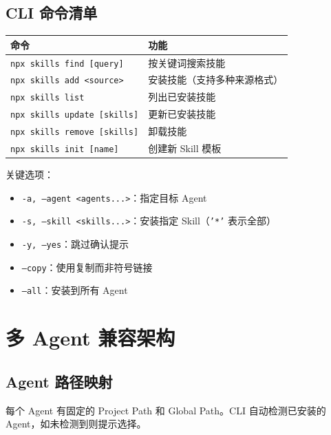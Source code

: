 \documentclass[11pt,a4paper]{article}
\begin{document}
\subsection{CLI 命令清单}

\begin{table}[h]
\centering
\begin{tabularx}{\linewidth}{lX}
\toprule
\textbf{命令} & \textbf{功能} \\
\midrule
\texttt{npx skills find [query]} & 按关键词搜索技能 \\
\texttt{npx skills add <source>} & 安装技能（支持多种来源格式） \\
\texttt{npx skills list} & 列出已安装技能 \\
\texttt{npx skills update [skills]} & 更新已安装技能 \\
\texttt{npx skills remove [skills]} & 卸载技能 \\
\texttt{npx skills init [name]} & 创建新 Skill 模板 \\
\bottomrule
\end{tabularx}
\end{table}

关键选项：
\begin{itemize}[nosep]
  \item \texttt{-a, --agent <agents...>}：指定目标 Agent
  \item \texttt{-s, --skill <skills...>}：安装指定 Skill（\texttt{'*'} 表示全部）
  \item \texttt{-y, --yes}：跳过确认提示
  \item \texttt{--copy}：使用复制而非符号链接
  \item \texttt{--all}：安装到所有 Agent
\end{itemize}

\section{多 Agent 兼容架构}

\subsection{Agent 路径映射}

每个 Agent 有固定的 Project Path 和 Global Path。CLI 自动检测已安装的 Agent，如未检测到则提示选择。
\end{document}
